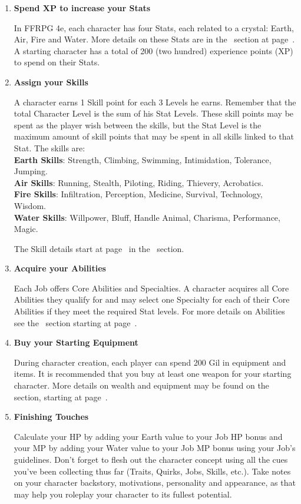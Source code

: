 \begin{multicols}{2}
\begin{enumerate}
\item \textbf{Spend XP to increase your Stats}

In FFRPG 4e, each character has four Stats, each related to a crystal: Earth, Air, Fire and Water. More details on these Stats are in the~ section at page~\pageref{subsec:stats}. A starting character has a total of 200 (two hundred) experience points (XP) to spend on their Stats. 

\item \textbf{Assign your Skills}

A character earns 1 Skill point for each 3 Levels he earns. Remember that the total Character Level is the sum of his Stat Levels. These skill points may be spent as the player wish between the skills, but the Stat Level is the maximum amount of skill points that may be spent in all skills linked to that Stat. The skills are: \\
\textbf{Earth Skills}: Strength, Climbing, Swimming, Intimidation, Tolerance, Jumping. \\
\textbf{Air Skills}: Running, Stealth, Piloting, Riding, Thievery, Acrobatics. \\
\textbf{Fire Skills}: Infiltration, Perception, Medicine, Survival, Technology, Wisdom. \\
\textbf{Water Skills}: Willpower, Bluff, Handle Animal, Charisma, Performance, Magic.

The Skill details start at page~\pageref{subsec:skills} in the~ section.

\item \textbf{Acquire your Abilities}

Each Job offers Core Abilities and Specialties. A character acquires all Core Abilities they qualify for and may select one Specialty for each of their Core Abilities if they meet the required Stat levels. For more details on Abilities see the~ section starting at page~\pageref{sec:jobs-summary}. 

\item \textbf{Buy your Starting Equipment}

During character creation, each player can spend 200 Gil in equipment and items. It is recommended that you buy at least one weapon for your starting character. More details on wealth and equipment may be found on the~ section, starting at page~\pageref{sec:inv-wealth}.

\item \textbf{Finishing Touches}

Calculate your HP by adding your Earth value to your Job HP bonus and your MP by adding your Water value to your Job MP bonus using your Job's guidelines. Don't forget to flesh out the character concept using all the cues you've been collecting thus far (Traits, Quirks, Jobs, Skills, etc.). Take notes on your character backstory, motivations, personality and appearance, as that may help you roleplay your character to its fullest potential.

\end{enumerate}
\end{multicols}
